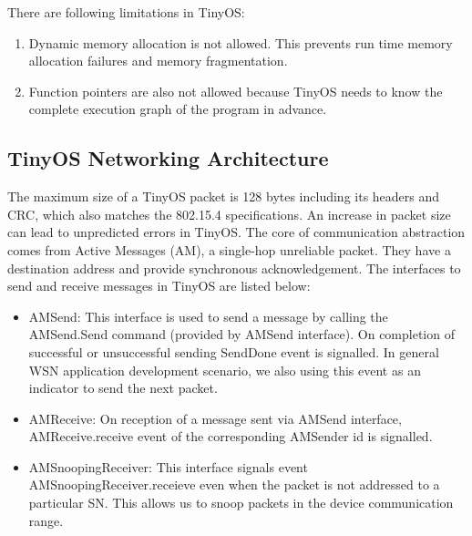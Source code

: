     \par
    There are following limitations in TinyOS:
    
    \begin{enumerate}
        \item Dynamic memory allocation is not allowed. This prevents run time memory allocation failures and memory fragmentation.
        
        \item Function pointers are also not allowed because TinyOS needs to know the complete execution graph of the program in advance.
    \end{enumerate}
    
    \subsection*{TinyOS Networking Architecture}\label{subsec:network-architecture}
    
    The maximum size of a TinyOS packet is 128 bytes including its headers and \ac{CRC}, which also matches the 802.15.4 specifications. An increase in packet size can lead to unpredicted errors in TinyOS. The core of communication abstraction comes from Active Messages (AM), a single-hop unreliable packet. They have a destination address and provide synchronous acknowledgement. The interfaces to send and receive messages in TinyOS are listed below:
    
    \begin{itemize}
        \item AMSend: This interface is used to send a message by calling the AMSend.Send command (provided by AMSend interface). On completion of successful or unsuccessful sending SendDone event is signalled. In general \ac{WSN} application development scenario, we also using this event as an indicator to send the next packet. 
        
        \item AMReceive: On reception of a message sent via AMSend interface, AMReceive.receive event of the corresponding AMSender id is signalled.
        
        \item AMSnoopingReceiver: This interface signals event AMSnoopingReceiver.receieve even when the packet is not addressed to a particular \ac{SN}. This allows us to snoop packets in the device communication range.
    \end{itemize}
    
